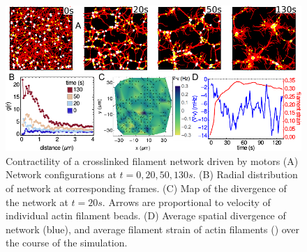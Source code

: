 \documentclass[12pt]{article}
\begin{document}
\begin{figure}[H] 
    \centering
    \includegraphics[scale=1.2]{figs/network.pdf}
  \caption{%
  \label{fig:network}%
  Contractility of a crosslinked filament network driven by motors
  (A) Network configurations at $t=0, 20, 50, 130s$.  
  (B) Radial distribution of network at corresponding frames.   
  (C) Map of the divergence of the network at $t=20s$. Arrows are proportional to 
  velocity of individual actin filament beads.  
  (D) Average spatial divergence of network (blue), and average filament strain
  of actin filaments () over the course of the simulation. 
 }
\end{figure}
\end{document}
